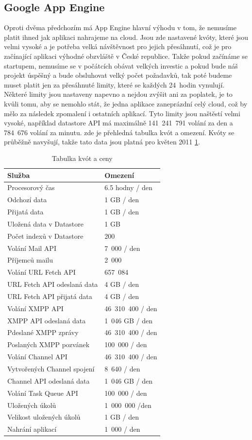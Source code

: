 \subsection{Google App Engine}
Oproti dvěma předchozím má App Engine hlavní výhodu v tom, že nemusíme platit ihned jak aplikaci nahrajeme na cloud. Jsou zde nastavené kvóty, které jsou velmi vysoké a je potřeba velká návštěvnost pro jejich přesáhnutí, což je pro začínající aplikaci výhodné obzvláště v České republice. Takže pokud začínáme se startupem, nemusíme se v počátcích obávat velkých investic a pokud bude náš projekt úspěšný a bude obsluhovat velký počet požadavků, tak poté budeme muset platit jen za přesáhnuté limity, které se každých 24~hodin vynulují. Některé limity jsou nastaveny napevno a nejdou zvýšit ani za poplatek, je to kvůli tomu, aby se nemohlo stát, že jedna aplikace zaneprázdní celý cloud, což by mělo za následek zpomalení i ostatních aplikací. Tyto limity jsou naštěstí velmi vysoké, například datastore API má maximálně 141~241~791 volání za den a 784~676 volání za minutu.  zde je přehledná tabulka kvót a omezení. Kvóty se průběžně navyšují, takže tato data jsou  platná pro květen 2011 \ref{tab:quotas}.

\begin{table}[h]
\centering
\caption{Tabulka kvót a ceny}\label{tab:quotas}
\begin{tabular}{|l|l|}
   \hline
     Služba & Omezení \\
   \hline
    Procesorový čas & 6.5 hodny / den \\
    Odchozí data & 1 GB / den \\
    Přijatá data &1 GB / den \\
    Uložená data v Datastore & 1 GB \\
    Počet indexů v Datastore & 200 \\
    Volání Mail API & 7~000 / den \\ 
    Příjemců mailu & 2~000 \\
    Volání URL Fetch API & 657~084 \\
    URL Fetch API odeslaná data  & 4 GB / den \\
    URL Fetch API přijatá data  & 4 GB / den \\
    Volání XMPP API & 46~310~400 / den \\
    XMPP API odeslaná data & 1~046 GB / den \\
    Pdeslané XMPP zprávy & 46~310~400 / den \\
    Poslaných XMPP pozvánek & 100~000 / den \\
    Volání Channel API & 46~310~400 / den \\
    Vytvořených Channel spojení & 8~640 / den \\
    Channel API odeslaná data & 1~046  GB / den \\
    Volání Task Queue API & 100~000 / den \\
    Uložených úkolů & 1~000~000 /den \\
    Velikost uložených úkolů & 1 GB / den \\
    Nahrání aplikací & 1~000 / den \\
   \hline
\end{tabular}
\end{table}

